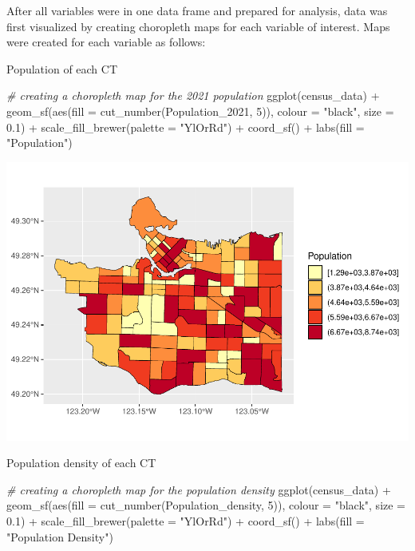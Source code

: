 \documentclass[
]{article}
\newenvironment{Shaded}{\begin{snugshade}}{\end{snugshade}}
\newcommand{\AttributeTok}[1]{\textcolor[rgb]{0.77,0.63,0.00}{#1}}
\newcommand{\CommentTok}[1]{\textcolor[rgb]{0.56,0.35,0.01}{\textit{#1}}}
\newcommand{\DecValTok}[1]{\textcolor[rgb]{0.00,0.00,0.81}{#1}}
\newcommand{\FloatTok}[1]{\textcolor[rgb]{0.00,0.00,0.81}{#1}}
\newcommand{\FunctionTok}[1]{\textcolor[rgb]{0.00,0.00,0.00}{#1}}
\newcommand{\NormalTok}[1]{#1}
\newcommand{\SpecialCharTok}[1]{\textcolor[rgb]{0.00,0.00,0.00}{#1}}
\newcommand{\StringTok}[1]{\textcolor[rgb]{0.31,0.60,0.02}{#1}}
\begin{document}
After all variables were in one data frame and prepared for analysis,
data was first visualized by creating choropleth maps for each variable
of interest. Maps were created for each variable as follows:

Population of each CT

\begin{Shaded}
\begin{Highlighting}[]
\CommentTok{\# creating a choropleth map for the 2021 population}
\FunctionTok{ggplot}\NormalTok{(census\_data) }\SpecialCharTok{+}
  \FunctionTok{geom\_sf}\NormalTok{(}\FunctionTok{aes}\NormalTok{(}\AttributeTok{fill =} \FunctionTok{cut\_number}\NormalTok{(Population\_2021, }\DecValTok{5}\NormalTok{)),}
          \AttributeTok{colour =} \StringTok{"black"}\NormalTok{,}
          \AttributeTok{size =} \FloatTok{0.1}\NormalTok{) }\SpecialCharTok{+}
  \FunctionTok{scale\_fill\_brewer}\NormalTok{(}\AttributeTok{palette =} \StringTok{"YlOrRd"}\NormalTok{) }\SpecialCharTok{+}
  \FunctionTok{coord\_sf}\NormalTok{() }\SpecialCharTok{+}
  \FunctionTok{labs}\NormalTok{(}\AttributeTok{fill =} \StringTok{"Population"}\NormalTok{)}
\end{Highlighting}
\end{Shaded}

\begin{center}\includegraphics[width=0.8\linewidth]{4GA3Markdown_files/figure-latex/unnamed-chunk-22-1} \end{center}

Population density of each CT

\begin{Shaded}
\begin{Highlighting}[]
\CommentTok{\# creating a choropleth map for the population density}
\FunctionTok{ggplot}\NormalTok{(census\_data) }\SpecialCharTok{+}
  \FunctionTok{geom\_sf}\NormalTok{(}\FunctionTok{aes}\NormalTok{(}\AttributeTok{fill =} \FunctionTok{cut\_number}\NormalTok{(Population\_density, }\DecValTok{5}\NormalTok{)),}
          \AttributeTok{colour =} \StringTok{"black"}\NormalTok{,}
          \AttributeTok{size =} \FloatTok{0.1}\NormalTok{) }\SpecialCharTok{+}
  \FunctionTok{scale\_fill\_brewer}\NormalTok{(}\AttributeTok{palette =} \StringTok{"YlOrRd"}\NormalTok{) }\SpecialCharTok{+}
  \FunctionTok{coord\_sf}\NormalTok{() }\SpecialCharTok{+}
  \FunctionTok{labs}\NormalTok{(}\AttributeTok{fill =} \StringTok{"Population Density"}\NormalTok{)}
\end{Highlighting}
\end{Shaded}
\end{document}
